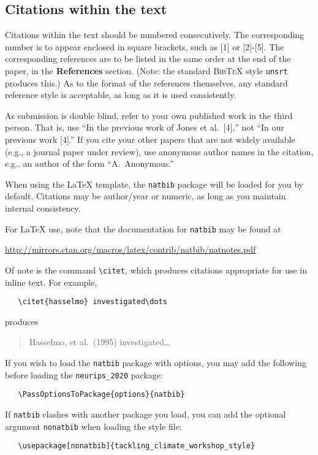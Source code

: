 \documentclass{article}
\begin{document}
\subsection{Citations within the text}

Citations within the text should be numbered consecutively.  The corresponding number is to appear enclosed in square brackets, such as [1] or [2]-[5].  The corresponding references are to be listed in the same order at the end of the paper, in the \textbf{References} section. (Note: the standard
\textsc{Bib\TeX} style \texttt{unsrt} produces this.) As to the format of the references themselves, any standard reference style is acceptable, as long as it is used consistently.


As submission is double blind, refer to your own published work in the third
person. That is, use ``In the previous work of Jones et al.\ [4],'' not ``In our
previous work [4].'' If you cite your other papers that are not widely available
(e.g., a journal paper under review), use anonymous author names in the
citation, e.g., an author of the form ``A.\ Anonymous.''

When using the \LaTeX{} template, the \verb+natbib+ package will be loaded for you by default.  Citations may be author/year or numeric, as long as you maintain internal consistency.

For \LaTeX{} use, note that the documentation for \verb+natbib+ may be found at
\begin{center}
  \url{http://mirrors.ctan.org/macros/latex/contrib/natbib/natnotes.pdf}
\end{center}
Of note is the command \verb+\citet+, which produces citations appropriate for
use in inline text.  For example,
\begin{verbatim}
   \citet{hasselmo} investigated\dots
\end{verbatim}
produces
\begin{quote}
  Hasselmo, et al.\ (1995) investigated\dots
\end{quote}

If you wish to load the \verb+natbib+ package with options, you may add the
following before loading the \verb+neurips_2020+ package:
\begin{verbatim}
   \PassOptionsToPackage{options}{natbib}
\end{verbatim}

If \verb+natbib+ clashes with another package you load, you can add the optional
argument \verb+nonatbib+ when loading the style file:
\begin{verbatim}
   \usepackage[nonatbib]{tackling_climate_workshop_style}
\end{verbatim}
\end{document}
